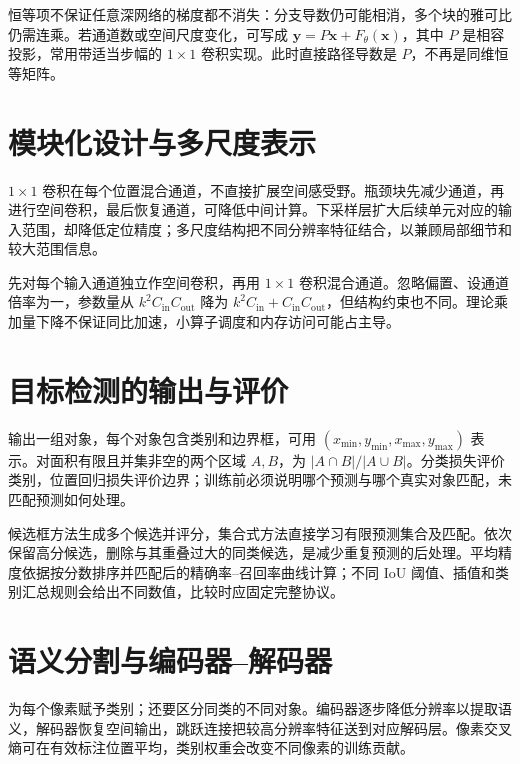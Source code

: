 \documentclass[UTF8,12pt,a4paper,fontset=fandol]{ctexbook}
\begin{document}
恒等项不保证任意深网络的梯度都不消失：分支导数仍可能相消，多个块的雅可比仍需连乘。若通道数或空间尺度变化，可写成 $\mathbf y=P\mathbf x+F_\theta(\mathbf x)$，其中 $P$ 是相容投影，常用带适当步幅的 $1\times1$ 卷积实现。此时直接路径导数是 $P$，不再是同维恒等矩阵。

\section{模块化设计与多尺度表示}
$1\times1$ 卷积在每个位置混合通道，不直接扩展空间感受野。瓶颈块先减少通道，再进行空间卷积，最后恢复通道，可降低中间计算。下采样层扩大后续单元对应的输入范围，却降低定位精度；多尺度结构把不同分辨率特征结合，以兼顾局部细节和较大范围信息。

先对每个输入通道独立作空间卷积，再用 $1\times1$ 卷积混合通道。忽略偏置、设通道倍率为一，参数量从 $k^2C_{\mathrm{in}}C_{\mathrm{out}}$ 降为 $k^2C_{\mathrm{in}}+C_{\mathrm{in}}C_{\mathrm{out}}$，但结构约束也不同。理论乘加量下降不保证同比加速，小算子调度和内存访问可能占主导。

\section{目标检测的输出与评价}
输出一组对象，每个对象包含类别和边界框，可用 $(x_{\min},y_{\min},x_{\max},y_{\max})$ 表示。对面积有限且并集非空的两个区域 $A,B$，为 $|A\cap B|/|A\cup B|$。分类损失评价类别，位置回归损失评价边界；训练前必须说明哪个预测与哪个真实对象匹配，未匹配预测如何处理。

候选框方法生成多个候选并评分，集合式方法直接学习有限预测集合及匹配。依次保留高分候选，删除与其重叠过大的同类候选，是减少重复预测的后处理。平均精度依据按分数排序并匹配后的精确率--召回率曲线计算；不同 IoU 阈值、插值和类别汇总规则会给出不同数值，比较时应固定完整协议。

\section{语义分割与编码器--解码器}
为每个像素赋予类别；还要区分同类的不同对象。编码器逐步降低分辨率以提取语义，解码器恢复空间输出，跳跃连接把较高分辨率特征送到对应解码层。像素交叉熵可在有效标注位置平均，类别权重会改变不同像素的训练贡献。
\end{document}
